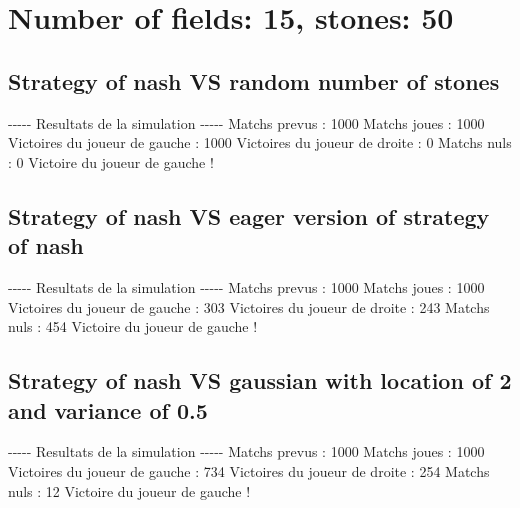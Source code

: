 \documentclass{article}%
\begin{document}
%
\section{Number of fields: 15, stones: 50}%
\label{sec:Number of fields 15, stones 50}%
\subsection{Strategy of nash VS random number of stones}%
\label{subsec:Strategy of nash VS random number of stones}%
{-}{-}{-}{-}{-} Resultats de la simulation {-}{-}{-}{-}{-}\newline%
		\newline%
Matchs prevus : 1000\newline%
Matchs joues : 1000\newline%
\newline%
Victoires du joueur de gauche : 1000\newline%
Victoires du joueur de droite : 0\newline%
Matchs nuls : 0\newline%
\newline%
Victoire du joueur de gauche !

%
\subsection{Strategy of nash VS eager version of strategy of nash}%
\label{subsec:Strategy of nash VS eager version of strategy of nash}%
{-}{-}{-}{-}{-} Resultats de la simulation {-}{-}{-}{-}{-}\newline%
		\newline%
Matchs prevus : 1000\newline%
Matchs joues : 1000\newline%
\newline%
Victoires du joueur de gauche : 303\newline%
Victoires du joueur de droite : 243\newline%
Matchs nuls : 454\newline%
\newline%
Victoire du joueur de gauche !

%
\subsection{Strategy of nash VS gaussian with location of 2 and variance of 0.5}%
\label{subsec:Strategy of nash VS gaussian with location of 2 and variance of 0.5}%
{-}{-}{-}{-}{-} Resultats de la simulation {-}{-}{-}{-}{-}\newline%
		\newline%
Matchs prevus : 1000\newline%
Matchs joues : 1000\newline%
\newline%
Victoires du joueur de gauche : 734\newline%
Victoires du joueur de droite : 254\newline%
Matchs nuls : 12\newline%
\newline%
Victoire du joueur de gauche !
\end{document}

